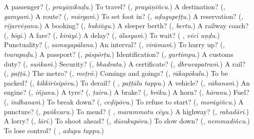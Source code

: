 \begin{tcolorbox}[breakable,colback=teal!4,colframe=teal!35!black,title={Before you move on}]
A passenger? (\textbf{}, \emph{prayāṇikuḍu}.) To travel? (\textbf{}, \emph{prayāṇiñcu}.) A destination? (\textbf{}, \emph{gamyaṁ}.) A route? (\textbf{}, \emph{mārgaṁ}.) To set foot in? (\textbf{}, \emph{aḍugupeṭṭu}.) A reservation? (\textbf{}, \emph{rijarvēṣanu}.) A booking? (\textbf{}, \emph{bukiṅgu}.) A sleeper berth? (\textbf{}, \emph{bertu}.) A railway coach? (\textbf{}, \emph{bōgī}.) A fare? (\textbf{}, \emph{kirāyi}.) A delay? (\textbf{}, \emph{ālasyaṁ}.) To wait? (\textbf{ }, \emph{vēci uṇḍu}.) Punctuality? (\textbf{}, \emph{samayapālana}.) An interval? (\textbf{}, \emph{virāmaṁ}.) To hurry up? (\textbf{}, \emph{tvarapaḍu}.) A passport? (\textbf{}, \emph{pāspōrṭu}.) Identification? (\textbf{}, \emph{gurtimpu}.) A customs duty? (\textbf{}, \emph{suṅkaṁ}.) Security? (\textbf{}, \emph{bhadrata}.) A certificate? (\textbf{}, \emph{dhruvapatraṁ}.) A rail? (\textbf{}, \emph{paṭṭā}.) The metro? (\textbf{}, \emph{meṭrō}.) Comings and goings? (\textbf{}, \emph{rākapōkalu}.) To be packed? (\textbf{}, \emph{kikkirisipōvu}.) To derail? (\textbf{ }, \emph{paṭṭālu tappu}.) A vehicle? (\textbf{}, \emph{vāhanaṁ}.) An engine? (\textbf{}, \emph{iñjanu}.) A tyre? (\textbf{}, \emph{ṭairu}.) A brake? (\textbf{}, \emph{brēku}.) A horn? (\textbf{}, \emph{hāranu}.) Fuel? (\textbf{}, \emph{indhanaṁ}.) To break down? (\textbf{}, \emph{ceḍipōvu}.) To refuse to start? (\textbf{}, \emph{morāyiñcu}.) A puncture? (\textbf{}, \emph{paṅkcaru}.) To mend? (\textbf{ }, \emph{marammatu cēyu}.) A highway? (\textbf{}, \emph{rahadāri}.) A lorry? (\textbf{}, \emph{lārī}.) To shoot ahead? (\textbf{}, \emph{dūsukupōvu}.) To slow down? (\textbf{}, \emph{nemmadiñcu}.) To lose control? (\textbf{ }, \emph{adupu tappu}.)
\end{tcolorbox}
